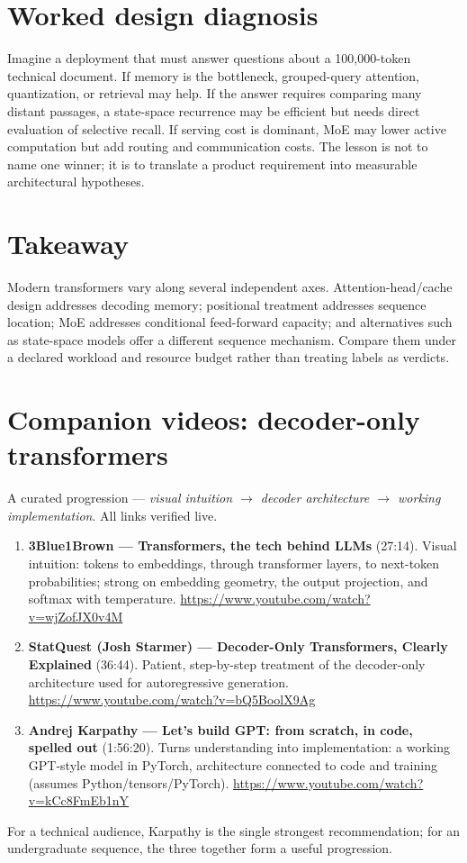 \documentclass[11pt]{article}
\begin{document}
\section{Worked design diagnosis}
Imagine a deployment that must answer questions about a 100,000-token technical document. If memory is the bottleneck, grouped-query attention, quantization, or retrieval may help. If the answer requires comparing many distant passages, a state-space recurrence may be efficient but needs direct evaluation of selective recall. If serving cost is dominant, MoE may lower active computation but add routing and communication costs. The lesson is not to name one winner; it is to translate a product requirement into measurable architectural hypotheses.

\section{Takeaway}
Modern transformers vary along several independent axes. Attention-head/cache design addresses decoding memory; positional treatment addresses sequence location; MoE addresses conditional feed-forward capacity; and alternatives such as state-space models offer a different sequence mechanism. Compare them under a declared workload and resource budget rather than treating labels as verdicts.


\section*{Companion videos: decoder-only transformers}
A curated progression --- \emph{visual intuition $\rightarrow$ decoder architecture $\rightarrow$ working implementation}. All links verified live.
\begin{enumerate}[leftmargin=*]
  \item \textbf{3Blue1Brown --- Transformers, the tech behind LLMs} (27:14). Visual intuition: tokens to embeddings, through transformer layers, to next-token probabilities; strong on embedding geometry, the output projection, and softmax with temperature. \url{https://www.youtube.com/watch?v=wjZofJX0v4M}
  \item \textbf{StatQuest (Josh Starmer) --- Decoder-Only Transformers, Clearly Explained} (36:44). Patient, step-by-step treatment of the decoder-only architecture used for autoregressive generation. \url{https://www.youtube.com/watch?v=bQ5BoolX9Ag}
  \item \textbf{Andrej Karpathy --- Let's build GPT: from scratch, in code, spelled out} (1:56:20). Turns understanding into implementation: a working GPT-style model in PyTorch, architecture connected to code and training (assumes Python/tensors/PyTorch). \url{https://www.youtube.com/watch?v=kCc8FmEb1nY}
\end{enumerate}
For a technical audience, Karpathy is the single strongest recommendation; for an undergraduate sequence, the three together form a useful progression.
\end{document}
